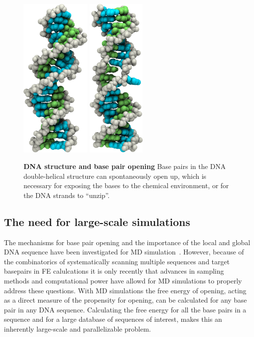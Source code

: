 \documentclass[11pt,a4paper]{article}
\begin{document}
\begin{figure}[thbp!]
\includegraphics[height=8cm]{figs/dna-helix-closed.png}
\includegraphics[height=8cm]{figs/dna-helix-flip.png}
\caption{\label{fig:dnastates}
\textbf{DNA structure and base pair opening} Base pairs in the DNA double-helical structure can spontaneously open up, which is necessary for exposing the bases to the chemical environment, or for the DNA strands to ``unzip''.
}
\end{figure}

\subsection{The need for large-scale simulations}
The mechanisms for base pair opening and the importance of the local and global DNA sequence have been investigated for MD simulation~\cite{lindahl2017sequence}. However, because of the combinatorics of systematically scanning multiple sequences and target basepairs in FE calulcations it is only recently that advances in sampling methods and computational power have allowd for MD simulations to properly address  these questions.
With MD simulations the free energy of opening, acting as a direct measure of the propensity for opening,
 can be calculated for any base pair in any DNA sequence. Calculating the free energy for all the base pairs in a sequence and for a large database of sequences of interest, makes this an inherently large-scale and parallelizable problem. 
\end{document}

